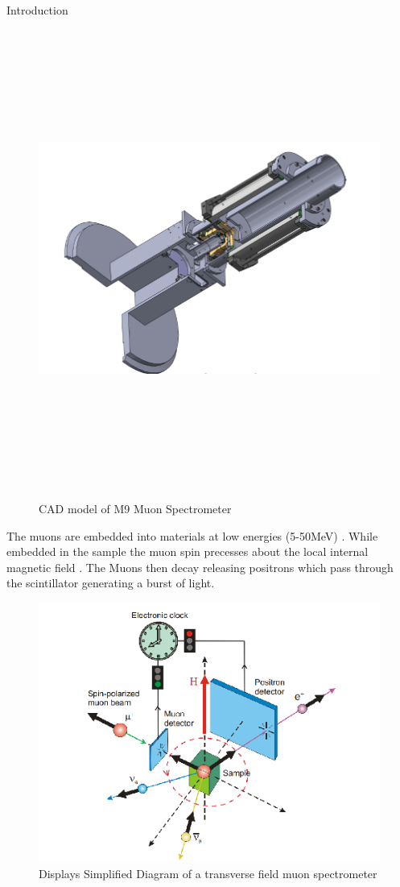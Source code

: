 \documentclass[final]{beamer}
\newlength{\onecolwid}
\begin{document}
\begin{frame}[t]
\begin{columns}[t]
\begin{column}{\onecolwid}
\begin{block}{Introduction}
\begin{figure}
{\includegraphics[height=15cm]{spect}}
\caption{CAD model of M9 Muon Spectrometer}
\end{figure}
The muons are embedded into materials at low energies (5-50MeV) \cite{musr}. While embedded in the sample the muon spin precesses about the local internal magnetic field \cite{mu}. The Muons then decay releasing positrons which pass through the scintillator generating a burst of light. 
\begin{figure}
\includegraphics[width=\linewidth]{spec}
\caption{Displays Simplified Diagram of a transverse field muon spectrometer \cite{mu} }
\end{figure}



\end{block}
\end{column}
\end{columns}
\end{frame}
\end{document}
